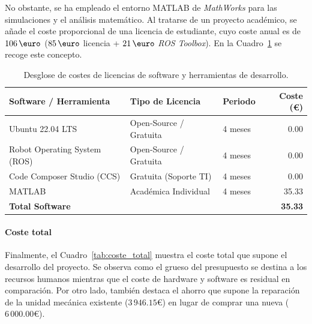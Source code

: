 \documentclass[11pt,fleqn]{book} %
\begin{document}
No obstante, se ha empleado el entorno MATLAB de \textit{MathWorks} para las simulaciones y el análisis matemático. Al tratarse de un proyecto académico, se añade el coste proporcional de una licencia de estudiante, cuyo coste anual es de $106\,\text{\euro}$ ($85\,\text{\euro}$ licencia + $21\,\text{\euro}$ \textit{ROS Toolbox}). En la Cuadro~\ref{tab:coste_software} se recoge este concepto.

\begin{table}[!htbp]
	\centering
	\caption{Desglose de costes de licencias de software y herramientas de desarrollo.}
	\label{tab:coste_software}
	\small %
	\begin{tabularx}{\textwidth}{@{} X l l r @{}}
		\toprule
		\textbf{Software / Herramienta} & \textbf{Tipo de Licencia} & \textbf{Periodo} & \textbf{Coste (\euro)} \\ 
		\midrule
		Ubuntu 22.04 LTS                & Open-Source / Gratuita    & 4 meses          & 0.00 \\
		Robot Operating System (ROS)    & Open-Source / Gratuita    & 4 meses          & 0.00 \\
		Code Composer Studio (CCS)      & Gratuita (Soporte TI)     & 4 meses          & 0.00 \\
		MATLAB                          & Académica Individual      & 4 meses          & 35.33 \\ 
		\midrule
		\textbf{Total Software}         &                           &                  & \textbf{35.33} \\ 
		\bottomrule
	\end{tabularx}
\end{table}
\FloatBarrier

\paragraph{Coste total}
Finalmente, el Cuadro~\ref{tab:coste_total} muestra el coste total que supone el desarrollo del proyecto. Se observa como el grueso del presupuesto se destina a los recursos humanos mientras que el coste de hardware y software es residual en comparación. Por otro lado, también destaca el ahorro que supone la reparación de la unidad mecánica existente ($3\,946.15$\euro) en lugar de comprar una nueva ($6\,000.00$\euro). 
\end{document}
